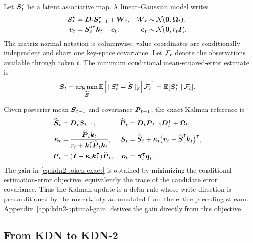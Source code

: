 \documentclass[11pt,letterpaper,logo]{yalearxiv}
\begin{document}
Let $\boldsymbol{S}_t^\star$ be a latent associative map. A linear--Gaussian model writes
\begin{equation}
\begin{aligned}
  \boldsymbol{S}_t^\star
  &=\boldsymbol{D}_t\boldsymbol{S}_{t-1}^\star+\boldsymbol{W}_t,
  &\boldsymbol{W}_t&\sim\mathcal N(\boldsymbol{0},\boldsymbol{\Omega}_t),\\
  \boldsymbol{v}_t
  &=\boldsymbol{S}_t^{\star\intercal}\boldsymbol{k}_t+\boldsymbol{e}_t,
  &\boldsymbol{e}_t&\sim\mathcal N(\boldsymbol{0},r_t\boldsymbol{I}).
\end{aligned}
\label{eq:kdn2-token-model}
\end{equation}
The matrix-normal notation is columnwise: value coordinates are conditionally independent and
share one key-space covariance. Let $\mathcal F_t$ denote the observations available through token
$t$. The minimum conditional mean-squared-error estimate is
\begin{equation}
  \boldsymbol{S}_t
  =
  \operatorname*{arg\,min}_{\widetilde{\boldsymbol{S}}}
  \mathbb{E}\!\left[
    \left.
    \|\boldsymbol{S}_t^\star-\widetilde{\boldsymbol{S}}\|_F^2
    \right|\mathcal F_t
  \right]
  =
  \mathbb{E}[\boldsymbol{S}_t^\star\mid\mathcal F_t].
  \label{eq:kdn2-mmse}
\end{equation}

Given posterior mean $\boldsymbol{S}_{t-1}$ and covariance $\boldsymbol{P}_{t-1}$, the exact Kalman reference is
\begin{equation}
\begin{aligned}
  \widehat{\boldsymbol{S}}_t
    &=\boldsymbol{D}_t\boldsymbol{S}_{t-1},
  &
  \widehat{\boldsymbol{P}}_t
    &=\boldsymbol{D}_t\boldsymbol{P}_{t-1}\boldsymbol{D}_t^{\intercal}+\boldsymbol{\Omega}_t,
  \\
  \boldsymbol{\kappa}_t
    &=\frac{\widehat{\boldsymbol{P}}_t\boldsymbol{k}_t}
      {r_t+\boldsymbol{k}_t^{\intercal}\widehat{\boldsymbol{P}}_t\boldsymbol{k}_t},
  &
  \boldsymbol{S}_t
    &=\widehat{\boldsymbol{S}}_t
      +\boldsymbol{\kappa}_t
       \big(\boldsymbol{v}_t-\widehat{\boldsymbol{S}}_t^{\intercal}\boldsymbol{k}_t\big)^{\intercal},
  \\
  \boldsymbol{P}_t
    &=(\boldsymbol{I}-\boldsymbol{\kappa}_t\boldsymbol{k}_t^{\intercal})
      \widehat{\boldsymbol{P}}_t,
  &
  \boldsymbol{o}_t
    &=\boldsymbol{S}_t^{\intercal}\boldsymbol{q}_t.
\end{aligned}
\label{eq:kdn2-token-exact}
\end{equation}
The gain in \eqref{eq:kdn2-token-exact} is obtained by minimizing the conditional
estimation-error objective, equivalently the trace of the candidate error covariance. Thus the
Kalman update is a delta rule whose write direction is preconditioned by the uncertainty accumulated
from the entire preceding stream. Appendix~\ref{app:kdn2-optimal-gain} derives the gain directly
from this objective.

\subsection{From KDN to KDN-2}
\label{sec:from-kdn-to-kdn2}
\end{document}
